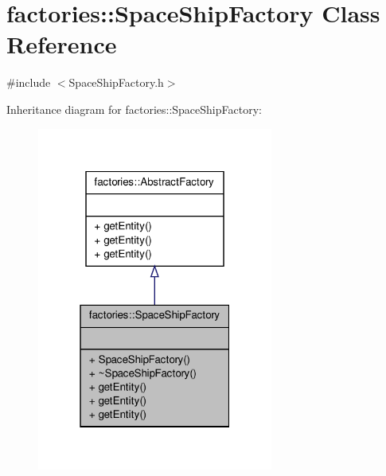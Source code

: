 \hypertarget{classfactories_1_1SpaceShipFactory}{\section{factories\-:\-:\-Space\-Ship\-Factory \-Class \-Reference}
\label{dd/dd6/classfactories_1_1SpaceShipFactory}
}


{\ttfamily \#include $<$\-Space\-Ship\-Factory.\-h$>$}



\-Inheritance diagram for factories\-:\-:\-Space\-Ship\-Factory\-:\nopagebreak
\begin{figure}[H]
\begin{center}
\leavevmode
\includegraphics[width=220pt]{d3/d18/classfactories_1_1SpaceShipFactory__inherit__graph}
\end{center}
\end{figure}


